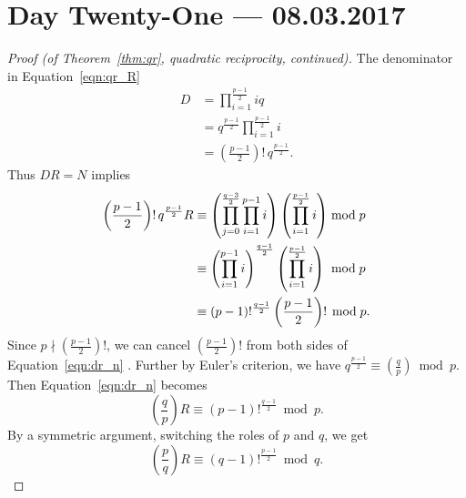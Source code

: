 \documentclass{amsbook}
\theoremstyle{plain}
\theoremstyle{definition}
\theoremstyle{remark}
\numberwithin{equation}{chapter}
\numberwithin{figure}{chapter}
\begin{document}
\chapter[Lecture Twenty-One]{Day Twenty-One \hfill {\footnotesize \rm --- 08.03.2017}}

\begin{proof}[Proof {\rm (of Theorem~\ref{thm:qr}, quadratic reciprocity, continued)}]
  The denominator in Equation~\eqref{eqn:qr_R}
  \begin{align}
    D &= \prod_{i=1}^{\frac{p-1}2} iq \\
      &= q^{\frac{p-1}2} \prod_{i=1}^{\frac{p-1}2} i \\
      &=\left(\frac{p-1}2\right)! \, q^{\frac{p-1}2}.
  \end{align}
  Thus $DR = N$ implies
  \begin{align}\label{eqn:dr_n}
    \begin{split}
      \left( \frac{p-1}2 \right)! \, q^{\frac{p-1}2} R &\equiv \left( \prod_{j=0}^{\frac{q-3}2} \prod_{i=1}^{p-1} i \right) \left( \prod_{i=1}^{\frac{p-1}2}  i \right) \bmod p \\
      &\equiv \left( \prod_{i=1}^{p-1} i \right)^{\frac{q-1}2} \left( \prod_{i=1}^{\frac{p-1}2}  i \right) \hspace{1mm} \bmod p \\
      &\equiv (p-1)!^{\frac{q-1}2}\left( \frac{p-1}2 \right)! \hspace{.5mm}\bmod p.
    \end{split}
  \end{align}
  Since $p \nmid \left( \frac{p-1}2 \right)!$, we can cancel $\left( \frac{p-1}2 \right)!$ from both sides of Equation~\eqref{eqn:dr_n} . Further by Euler's criterion, we have $q^{\frac{p-1}2} \equiv \left( \frac{q}p \right) \bmod p$. Then Equation~\eqref{eqn:dr_n} becomes
  \[
    \left( \frac{q}p \right) R \equiv (p-1)!^{\frac{q-1}2} \bmod p.
  \]
  By a symmetric argument, switching the roles of $p$ and $q$, we get
  \[
    \left( \frac{p}q \right) R \equiv (q-1)!^{\frac{p-1}2} \bmod q.
  \]


\end{proof}
\end{document}
